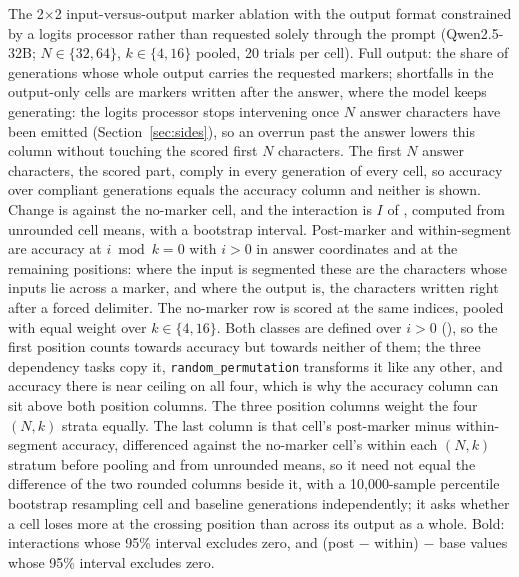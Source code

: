 \documentclass[10pt]{article} %
\newcommand{\task}[1]{\texttt{#1}}
\begin{document}
\begin{table}[!htb]
\centering
\small
\caption{The 2$\times$2 input-versus-output marker ablation with the output format constrained by a logits processor rather than requested solely through the prompt (Qwen2.5-32B; $N \in \{32, 64\}$, $k \in \{4, 16\}$ pooled, 20 trials per cell). Full output: the share of generations whose whole output carries the requested markers; shortfalls in the output-only cells are markers written after the answer, where the model keeps generating: the logits processor stops intervening once $N$ answer characters have been emitted (Section~\ref{sec:sides}), so an overrun past the answer lowers this column without touching the scored first $N$ characters. The first $N$ answer characters, the scored part, comply in every generation of every cell, so accuracy over compliant generations equals the accuracy column and neither is shown. Change is against the no-marker cell, and the interaction is $I$ of , computed from unrounded cell means, with a bootstrap interval. Post-marker and within-segment are accuracy at $i \bmod k = 0$ with $i > 0$ in answer coordinates and at the remaining positions: where the input is segmented these are the characters whose inputs lie across a marker, and where the output is, the characters written right after a forced delimiter. The no-marker row is scored at the same indices, pooled with equal weight over $k \in \{4, 16\}$. Both classes are defined over $i > 0$ (), so the first position counts towards accuracy but towards neither of them; the three dependency tasks copy it, \task{random\_permutation} transforms it like any other, and accuracy there is near ceiling on all four, which is why the accuracy column can sit above both position columns. The three position columns weight the four $(N, k)$ strata equally. The last column is that cell's post-marker minus within-segment accuracy, differenced against the no-marker cell's within each $(N, k)$ stratum before pooling and from unrounded means, so it need not equal the difference of the two rounded columns beside it, with a 10,000-sample percentile bootstrap resampling cell and baseline generations independently; it asks whether a cell loses more at the crossing position than across its output as a whole. Bold: interactions whose 95\% interval excludes zero, and (post $-$ within) $-$ base values whose 95\% interval excludes zero.}
\label{tab:sidesforced}
\resizebox{\linewidth}{!}{}
\end{table}
\end{document}
